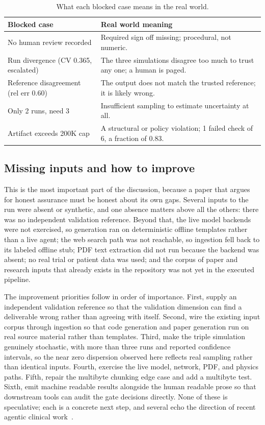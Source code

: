 \begin{table}[H]
\caption{What each blocked case means in the real world.}
\label{tab:discussion_blocks}
\centering
\begin{tabularx}{\textwidth}{L{6.6cm} >{\raggedright\arraybackslash}X}
\toprule
\textbf{Blocked case} & \textbf{Real world meaning} \\
\midrule
  No human review recorded & Required sign off missing; procedural, not numeric. \\
  Run divergence (CV 0.365, escalated) & The three simulations disagree too much to trust any one; a human is paged. \\
  Reference disagreement (rel err 0.60) & The output does not match the trusted reference; it is likely wrong. \\
  Only 2 runs, need 3 & Insufficient sampling to estimate uncertainty at all. \\
  Artifact exceeds 200K cap & A structural or policy violation; 1 failed check of 6, a fraction of 0.83. \\
\bottomrule
\end{tabularx}
\end{table}

\subsection{Missing inputs and how to improve}

This is the most important part of the discussion, because a paper that argues
for honest assurance must be honest about its own gaps. Several inputs to the run
were absent or synthetic, and one absence matters above all the others: there was
no independent validation reference. Beyond that, the live model backends were not
exercised, so generation ran on deterministic offline templates rather than a
live agent; the web search path was not reachable, so ingestion fell back to its
labeled offline stub; PDF text extraction did not run because the backend was
absent; no real trial or patient data was used; and the corpus of paper and
research inputs that already exists in the repository was not yet in the
executed pipeline. 

The improvement priorities follow in order of importance.
First, supply an independent validation reference so that the validation
dimension can find a deliverable wrong rather than agreeing with itself. Second,
wire the existing input corpus through ingestion so that code generation and
paper generation run on real source material rather than templates. Third, make
the triple simulation genuinely stochastic, with more than three runs and
reported confidence intervals, so the near zero dispersion observed here reflects
real sampling rather than identical inputs. Fourth, exercise the live model,
network, PDF, and physics paths. Fifth, repair the multibyte chunking edge case
and add a multibyte test. Sixth, emit machine readable results alongside the
human readable prose so that downstream tools can audit the gate decisions
directly. None of these is speculative; each is a concrete next step, and several
echo the direction of recent agentic clinical work~\cite{trooskens2026compiled,
kawchak2026prediction}.

